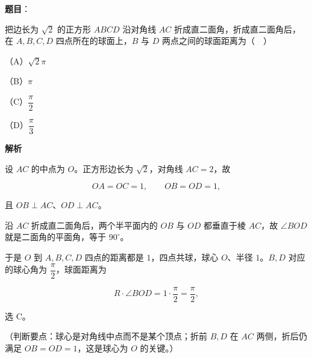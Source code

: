 \begin{answer}

\textbf{题目}：

把边长为 $\sqrt2$ 的正方形 $ABCD$ 沿对角线 $AC$ 折成直二面角，折成直二面角后，在 $A,B,C,D$ 四点所在的球面上，$B$ 与 $D$ 两点之间的球面距离为（　）

（A）$\sqrt2\pi$

（B）$\pi$

（C）$\dfrac{\pi}{2}$

（D）$\dfrac{\pi}{3}$

\textbf{解析}

设 $AC$ 的中点为 $O$。正方形边长为 $\sqrt2$，对角线 $AC=2$，故

\nopagebreak[4]
\[OA=OC=1,\qquad OB=OD=1,\]

且 $OB\perp AC$、$OD\perp AC$。

沿 $AC$ 折成直二面角后，两个半平面内的 $OB$ 与 $OD$ 都垂直于棱 $AC$，故 $\angle BOD$ 就是二面角的平面角，等于 $90^\circ$。

于是 $O$ 到 $A,B,C,D$ 四点的距离都是 $1$，四点共球，球心 $O$、半径 $1$。$B,D$ 对应的球心角为 $\dfrac{\pi}{2}$，球面距离为

\nopagebreak[4]
\[R\cdot\angle BOD=1\cdot\frac{\pi}{2}=\frac{\pi}{2},\]

选 C。

（判断要点：球心是对角线中点而不是某个顶点；折前 $B,D$ 在 $AC$ 两侧，折后仍满足 $OB=OD=1$，这是球心为 $O$ 的关键。）


\end{answer}
